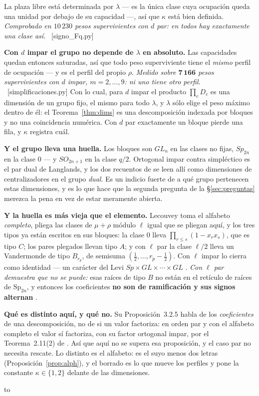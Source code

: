 \documentclass[11pt,a4paper]{article}
\newcommand{\Sp}{\mathrm{Sp}}
\newcommand{\ver}[1]{\unskip\penalty0\ \textcolor{azul}{\small\textsf{[#1]}}}
\newenvironment{keybox}
  {\par\vspace{9pt}\begin{lrbox}{\fichabox}%
   \begin{minipage}{0.90\textwidth}\vspace{7pt}\setlength{\parskip}{3pt}}
  {\vspace{7pt}\end{minipage}\end{lrbox}%
   \par\noindent\hbox to \textwidth{\hfill
   \textcolor{azul}{\rule[-\dp\fichabox]{3.2pt}{\dimexpr\ht\fichabox+\dp\fichabox\relax}}%
   \colorbox{fondoficha}{\usebox{\fichabox}}\hfill}%
   \par\vspace{9pt}}
\begin{document}
\noindent La plaza libre está determinada por $\lambda$ --- es la única clase cuya ocupación queda
una unidad por debajo de su capacidad ---, así que $\kappa$ está bien definida. \emph{Comprobado en
$10\,230$ pesos supervivientes con $d$ par: en todos hay exactamente una clase así.}
\ver{signo\_Fq.py}

\begin{keybox}
\textbf{Con $d$ impar el grupo no depende de $\lambda$ en absoluto.} Las capacidades quedan entonces
saturadas, así que todo peso superviviente tiene el \emph{mismo} perfil de ocupación --- y es el
perfil del propio $\rho$. \emph{Medido sobre $\mathbf{7\,166}$ pesos supervivientes con $d$ impar,
$m=2,\dots,9$: ni uno tiene otro perfil.} \ver{simplificaciones.py} Con lo cual, para $d$ impar el
producto $\prod_c D_c$ es una dimensión de un grupo fijo, el mismo para todo $\lambda$, y $\lambda$
sólo elige el peso máximo dentro de él: el Teorema~\ref{thm:dims} es una descomposición indexada por
bloques y no una coincidencia numérica. Con $d$ par exactamente un bloque pierde una fila, y
$\kappa$ registra cuál.

\smallskip
\textbf{Y el grupo lleva una huella.} Los bloques son $GL_{n}$ en las clases no fijas, $Sp_{2n}$ en
la clase $0$ --- y $SO_{2n+1}$ en la clase $q/2$. Ortogonal impar contra simpléctico es el par dual
de Langlands, y los dos recuentos de \cite{NPP25} se leen allí como dimensiones de centralizadores
en el grupo \emph{dual}. Es un indicio fuerte de a qué grupo pertenecen estas dimensiones, y es lo
que hace que la segunda pregunta de la \S\ref{sec:preguntas} merezca la pena en vez de estar
meramente abierta.

\smallskip
\textbf{Y la huella es más vieja que el elemento.} Lecouvey \cite[\S3.2.2]{Lec07a} toma el alfabeto
\emph{completo}, pliega las clases de $\mu+\rho$ módulo $\ell$ igual que se pliegan aquí, y los tres
tipos ya están escritos en sus bloques: la clase $0$ lleva $\prod_{r\le s}(1-x_rx_s)$, que es tipo
$C$; los pares plegados llevan tipo $A$; y con $\ell$ par la clase $\ell/2$ lleva un Vandermonde de
tipo $B_{r_p}$, de semisuma $(\tfrac12,\dots,r_p-\tfrac12)$. Con $\ell$ impar lo cierra como
identidad --- un carácter del Levi $Sp\times GL\times\cdots\times GL$ \cite[Teor.~3.2.3]{Lec07a}.
\emph{Con $\ell$ par demuestra que no se puede:} esas raíces de tipo $B$ no están en el retículo de
raíces de $\Sp_{2n}$, y entonces los coeficientes \textbf{no son de ramificación y sus signos
alternan} \cite[Prop.~3.2.5]{Lec07a}.

\smallskip
\textbf{Qué es distinto aquí, y qué no.} Su Proposición~3.2.5 habla de los \emph{coeficientes} de
una descomposición, no de si un valor factoriza: en orden par y con el alfabeto completo el valor
sí factoriza, con su factor ortogonal impar, por el Teorema~2.11(2) de \cite{AK22}. Así que aquí
no se supera esa proposición, y el caso par no necesita rescate. Lo distinto es el alfabeto: es el
suyo menos dos letras (Proposición~\ref{prop:alph}), y el borrado es lo que mueve los perfiles y
pone la constante $\kappa\in\{1,2\}$ delante de las dimensiones.
\end{keybox}
\end{document}
